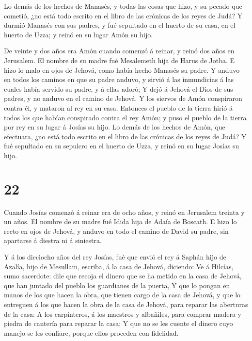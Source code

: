 Lo demás de los hechos de Manasés, y todas las cosas que
hizo, y su pecado que cometió, ¿no está todo escrito en el libro de las
crónicas de los reyes de Judá?  Y durmió Manasés con sus
padres, y fué sepultado en el huerto de su casa, en el huerto de Uzza; y
reinó en su lugar Amón su hijo.

 De veinte y dos años era Amón cuando comenzó á reinar, y
reinó dos años en Jerusalem. El nombre de su madre fué Mesalemeth hija
de Harus de Jotba.  E hizo lo malo en ojos de Jehová, como
había hecho Manasés su padre.  Y anduvo en todos los
caminos en que su padre anduvo, y sirvió á las inmundicias á las cuales
había servido su padre, y á ellas adoró;  Y dejó á Jehová
el Dios de sus padres, y no anduvo en el camino de Jehová. 
Y los siervos de Amón conspiraron contra él, y mataron al rey en su
casa.  Entonces el pueblo de la tierra hirió á todos los
que habían conspirado contra el rey Amón; y puso el pueblo de la tierra
por rey en su lugar á Josías su hijo.  Lo demás de los
hechos de Amón, que efectuara, ¿no está todo escrito en el libro de las
crónicas de los reyes de Judá?  Y fué sepultado en su
sepulcro en el huerto de Uzza, y reinó en su lugar Josías su hijo.

\hypertarget{section-21}{%
\section{22}\label{section-21}}

 Cuando Josías comenzó á reinar era de ocho años, y reinó en
Jerusalem treinta y un años. El nombre de su madre fué Idida hija de
Adaía de Boscath.  E hizo lo recto en ojos de Jehová, y
anduvo en todo el camino de David su padre, sin apartarse á diestra ni á
siniestra.

 Y á los dieciocho años del rey Josías, fué que envió el rey
á Saphán hijo de Azalía, hijo de Mesullam, escriba, á la casa de Jehová,
diciendo:  Ve á Hilcías, sumo sacerdote: dile que recoja el
dinero que se ha metido en la casa de Jehová, que han juntado del pueblo
los guardianes de la puerta,  Y que lo pongan en manos de
los que hacen la obra, que tienen cargo de la casa de Jehová, y que lo
entreguen á los que hacen la obra de la casa de Jehová, para reparar las
aberturas de la casa:  A los carpinteros, á los maestros y
albañiles, para comprar madera y piedra de cantería para reparar la
casa;  Y que no se les cuente el dinero cuyo manejo se les
confiare, porque ellos proceden con fidelidad.

